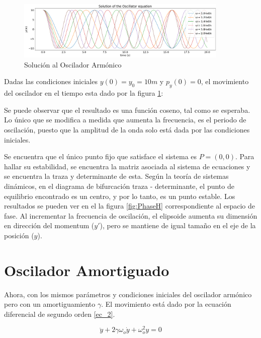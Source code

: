 \documentclass[a4paper]{article}
\theoremstyle{definition}
\theoremstyle{plain}
\begin{document}
\begin{figure}[H]
\begin {center}
\includegraphics[width=0.9\textwidth]{output_2_2.png}
\caption{Solución al Oscilador Armónico}
\label{fig:solutionH}
\end {center}
\end{figure}


Dadas las condiciones iniciales $y(0) = y_0 = 10m $ y $p_y(0) = 0$, el movimiento del oscilador en el tiempo esta dado por la figura \ref{fig:solutionH}:


Se puede observar que el resultado es una función coseno, tal como se esperaba. Lo único que se modifica a medida que aumenta la frecuencia, es el periodo de oscilación, puesto que la amplitud de la onda solo está dada por las condiciones iniciales. 

Se encuentra que el único punto fijo que satisface el sistema es $P =(0, 0)$. Para hallar su estabilidad, se encuentra la matriz asociada al sistema de ecuaciones y se encuentra la traza y determinante de esta. Según la teoría de sistemas dinámicos, en el diagrama de bifurcación traza - determinante, el punto de equilibrio encontrado es un centro, y por lo tanto, es un punto estable. Los resultados se pueden ver en el la figura \ref{fig:PhaseH} correspondiente al espacio de fase. Al incrementar la frecuencia de oscilación, el elipsoide aumenta su dimensión en dirección del momentum ($y'$), pero se mantiene de igual tamaño en el eje de la posición ($y$). 



\section*{Oscilador Amortiguado}

Ahora, con los mismos parámetros y condiciones iniciales del oscilador armónico pero con un amortiguamiento $\gamma$. El movimiento está dado por la ecuación diferencial de segundo orden \ref{ec_2}.

\begin{equation}
 \ddot y + 2\gamma \omega_o \dot y + \omega_o^2  y = 0
 \label{ec_2}
\end{equation}
\end{document}
